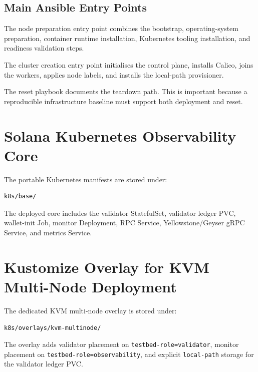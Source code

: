 \documentclass[11pt,a4paper]{article}
\begin{document}
\subsection{Main Ansible Entry Points}

The node preparation entry point combines the bootstrap, operating-system preparation, container runtime installation, Kubernetes tooling installation, and readiness validation steps.



The cluster creation entry point initialises the control plane, installs Calico, joins the workers, applies node labels, and installs the local-path provisioner.



The reset playbook documents the teardown path. This is important because a reproducible infrastructure baseline must support both deployment and reset.



\section{Solana Kubernetes Observability Core}

The portable Kubernetes manifests are stored under:

\begin{lstlisting}
k8s/base/
\end{lstlisting}

The deployed core includes the validator StatefulSet, validator ledger PVC, wallet-init Job, monitor Deployment, RPC Service, Yellowstone/Geyser gRPC Service, and metrics Service.

\section{Kustomize Overlay for KVM Multi-Node Deployment}

The dedicated KVM multi-node overlay is stored under:

\begin{lstlisting}
k8s/overlays/kvm-multinode/
\end{lstlisting}

The overlay adds validator placement on \texttt{testbed-role=validator}, monitor placement on \texttt{testbed-role=observability}, and explicit \texttt{local-path} storage for the validator ledger PVC.
\end{document}
